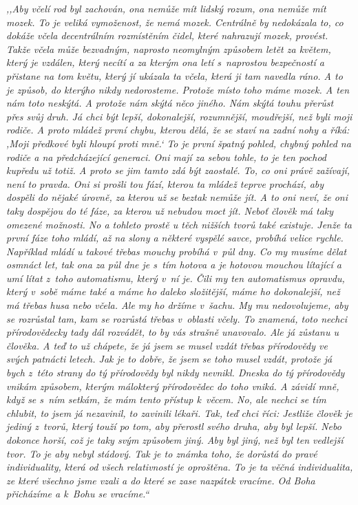 \begin{enumerate}
{%
\textit{%
,,Aby včelí rod byl zachován, ona nemůže mít lidský rozum, ona nemůže mít mozek.
To je veliká vymoženost, že nemá mozek. Centrálně by nedokázala to, co dokáže
včela decentrálním rozmístěním čidel, které nahrazují mozek, provést. Takže
včela může bezvadným, naprosto neomylným způsobem letět za květem, který je
vzdálen, který necítí a za kterým ona letí s~naprostou bezpečností a přistane na
tom květu, který jí ukázala ta včela, která ji tam navedla
ráno. A to je způsob, do kterýho nikdy nedorosteme. Protože místo
toho máme mozek. A ten nám toto neskýtá. A protože nám skýtá něco jiného. Nám
skýtá touhu přerůst přes svůj druh. Já chci být lepší, dokonalejší, rozumnější,
moudřejší, než byli moji rodiče. A proto mládež první chybu, kterou dělá, že se
staví na zadní nohy a říká: ,Moji předkové byli hloupí proti mně.` To je
první špatný pohled, chybný pohled na rodiče a na předcházející generaci.
Oni mají za sebou tohle, to je ten pochod kupředu už totiž. A proto se jim
tamto zdá být zaostalé. To, co oni právě zažívají, není to pravda. Oni si
prošli tou fází, kterou ta mládež teprve prochází, aby dospěli do nějaké úrovně,
za kterou už se beztak nemůže jít. A to oni neví, že oni taky dospějou do té
fáze, za kterou už nebudou moct jít. Neboť člověk má taky omezené možnosti. No a
tohleto prostě u těch nižších tvorů také existuje. Jenže ta první fáze toho
mládí, až na slony a některé vyspělé savce, probíhá velice rychle. Například
mládí u takové třebas mouchy probíhá v~půl dny. Co my musíme dělat
osmnáct let, tak ona za půl dne je s~tím hotova a je hotovou mouchou lítající a
umí lítat z~toho automatismu, který v~ní je. Čili my ten automatismus opravdu,
který v~sobě máme také a máme ho daleko složitější, máme ho
dokonalejší, než má třebas husa nebo včela. Ale my ho držíme v~šachu. My
mu nedovolujeme, aby se rozrůstal tam, kam se rozrůstá třebas v~oblasti
včely. To znamená, toto nechci přírodovědecky tady dál rozvádět, to by vás
strašně unavovalo. Ale já zůstanu u člověka. A teď to už chápete, že já
jsem se musel vzdát třebas přírodovědy ve svých patnácti letech. Jak je to
dobře, že jsem se toho musel vzdát, protože já bych z~této strany do tý
přírodovědy byl nikdy nevnikl. Dneska do tý přírodovědy vnikám způsobem, kterým
málokterý přírodovědec do toho vniká. A závidí mně, když se s~ním setkám, že
mám tento přístup k~věcem. No, ale nechci se tím chlubit, to jsem já nezavinil,
to zavinili lékaři. Tak, teď chci říci: Jestliže člověk je jediný z~tvorů, který
touží po tom, aby přerostl svého druha, aby byl lepší. Nebo dokonce horší, což
je taky svým způsobem jiný. Aby byl jiný, než byl ten vedlejší tvor. To je
aby nebyl stádový. Tak je to známka toho, že dorůstá do pravé individuality,
která od všech relativností je oproštěna. To je ta věčná individualita, ze které
všechno jsme vzali a do které se zase nazpátek vracíme. Od Boha přicházíme a
k~Bohu se vracíme.``
}

}
\end{enumerate}
